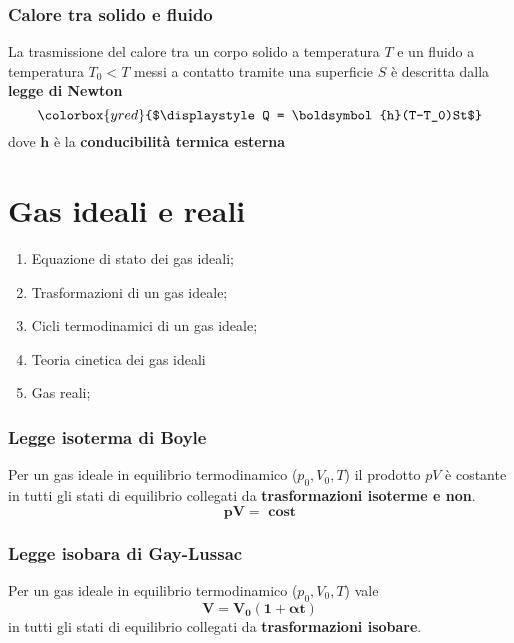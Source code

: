 \documentclass[x11names]{report}
\newcommand{\viola}[1]{\colorbox{yred}{$\displaystyle #1$}}
\begin{document}
\subsection{Calore tra solido e fluido}
La trasmissione del calore tra un corpo solido a temperatura \(T\) e un fluido a temperatura \(T_0 < T\) messi a contatto tramite una superficie \(S\) è descritta dalla \textbf{legge di Newton}
\begin{equation}
	\viola{Q = \boldsymbol{h}(T-T_0)St}
\end{equation}
dove \(\boldsymbol{h}\) è la \textbf{conducibilità termica esterna}

\newpage
\chapter{Gas ideali e reali}
\begin{es}{}
	\begin{enumerate}
		\item Equazione di stato dei gas ideali;
		\item Trasformazioni di un gas ideale;
		\item Cicli termodinamici di un gas ideale;
		\item Teoria cinetica dei gas ideali
		\item Gas reali;
	\end{enumerate}
\end{es}


\begin{center}
	\colorbox{yred}{\begin{minipage}{5.75in}
			\begin{redes}{}
				\subsection{Legge isoterma di Boyle}
				Per un gas ideale in equilibrio termodinamico (\(p_{0}, V_{0}, T\)) il prodotto \(pV\) è costante  in tutti gli stati di equilibrio collegati da \textbf{trasformazioni isoterme e non}.
				\[ 
				\boldsymbol{pV = \text{ cost}}
				\]
			\end{redes}
	\end{minipage}}
\end{center}

\begin{center}
	\colorbox{yred}{\begin{minipage}{5.75in}
			\begin{redes}{}
				\subsection{Legge isobara di Gay-Lussac}
				Per un gas ideale in equilibrio termodinamico (\(p_{0}, V_{0}, T\)) vale
				\[ 
				\boldsymbol{V = V_0(1 + \alpha t)}
				\]
				in tutti gli stati di equilibrio collegati da \textbf{trasformazioni isobare}.
			\end{redes}
	\end{minipage}}
\end{center}
\end{document}
